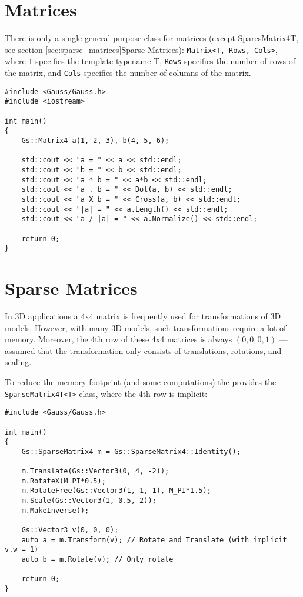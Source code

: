 \documentclass{article}
\begin{document}

\section*{Matrices}

There is only a single general-purpose class for matrices
(except SparesMatrix4T, see section \ref{sec:sparse_matrices}{Sparse Matrices}):
\texttt{Matrix<T, Rows, Cols>}, where \texttt{T} specifies the template typename T, \texttt{Rows} specifies the
number of rows of the matrix, and \texttt{Cols} specifies the number of columns of the matrix.

\begin{lstlisting}
#include <Gauss/Gauss.h>
#include <iostream>

int main()
{
	Gs::Matrix4 a(1, 2, 3), b(4, 5, 6);
	
	std::cout << "a = " << a << std::endl;
	std::cout << "b = " << b << std::endl;
	std::cout << "a * b = " << a*b << std::endl;
	std::cout << "a . b = " << Dot(a, b) << std::endl;
	std::cout << "a X b = " << Cross(a, b) << std::endl;
	std::cout << "|a| = " << a.Length() << std::endl;
	std::cout << "a / |a| = " << a.Normalize() << std::endl;
	
	return 0;
}
\end{lstlisting}



\section*{Sparse Matrices}
\label{sec:sparse_matrices}

In 3D applications a 4x4 matrix is frequently used for transformations of 3D models.
However, with many 3D models, such transformations require a lot of memory.
Moreover, the 4th row of these 4x4 matrices is always $(0, 0, 0, 1)$ --- assumed that the transformation
only consists of translations, rotations, and scaling.

To reduce the memory footprint (and some computations) the \gausslib provides the \texttt{SparseMatrix4T<T>} class,
where the 4th row is implicit:
\begin{lstlisting}
#include <Gauss/Gauss.h>

int main()
{
	Gs::SparseMatrix4 m = Gs::SparseMatrix4::Identity();
	
	m.Translate(Gs::Vector3(0, 4, -2));
	m.RotateX(M_PI*0.5);
	m.RotateFree(Gs::Vector3(1, 1, 1), M_PI*1.5);
	m.Scale(Gs::Vector3(1, 0.5, 2));
	m.MakeInverse();
	
	Gs::Vector3 v(0, 0, 0);
	auto a = m.Transform(v); // Rotate and Translate (with implicit v.w = 1)
	auto b = m.Rotate(v); // Only rotate
	
	return 0;
}
\end{lstlisting}
\end{document}
